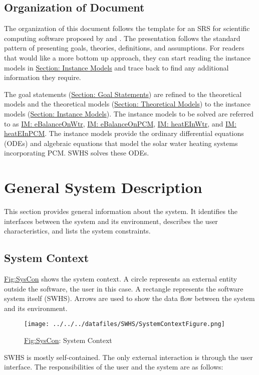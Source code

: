 \documentclass[12pt]{article}
\begin{document}
\subsection{Organization of Document}
\label{Sec:DocOrg}
The organization of this document follows the template for an SRS for scientific computing software proposed by \cite{koothoor2013} and \cite{smithLai2005}. The presentation follows the standard pattern of presenting goals, theories, definitions, and assumptions. For readers that would like a more bottom up approach, they can start reading the instance models in \hyperref[Sec:IMs]{Section: Instance Models} and trace back to find any additional information they require.

The goal statements (\hyperref[Sec:GoalStmt]{Section: Goal Statements}) are refined to the theoretical models and the theoretical models (\hyperref[Sec:TMs]{Section: Theoretical Models}) to the instance models (\hyperref[Sec:IMs]{Section: Instance Models}). The instance models to be solved are referred to as \hyperref[IM:eBalanceOnWtr]{IM: eBalanceOnWtr}, \hyperref[IM:eBalanceOnPCM]{IM: eBalanceOnPCM}, \hyperref[IM:heatEInWtr]{IM: heatEInWtr}, and \hyperref[IM:heatEInPCM]{IM: heatEInPCM}. The instance models provide the ordinary differential equations (ODEs) and algebraic equations that model the solar water heating systems incorporating PCM. SWHS solves these ODEs.

\section{General System Description}
\label{Sec:GenSysDesc}
This section provides general information about the system. It identifies the interfaces between the system and its environment, describes the user characteristics, and lists the system constraints.

\subsection{System Context}
\label{Sec:SysContext}
\hyperref[Figure:SysCon]{Fig:SysCon} shows the system context. A circle represents an external entity outside the software, the user in this case. A rectangle represents the software system itself (SWHS). Arrows are used to show the data flow between the system and its environment.

\begin{figure}
\begin{center}
\texttt{[image: ../../../datafiles/SWHS/SystemContextFigure.png]}
\caption{\hyperref[Figure:SysCon]{Fig:SysCon}: System Context}
\label{Figure:SysCon}
\end{center}
\end{figure}
SWHS is mostly self-contained. The only external interaction is through the user interface. The responsibilities of the user and the system are as follows:
\end{document}
